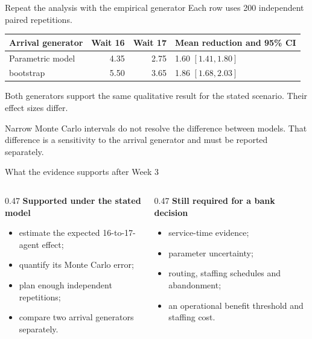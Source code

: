 \documentclass{beamer}
\begin{document}
\begin{frame}{Repeat the analysis with the empirical generator}
  \footnotesize
  Each row uses 200 independent paired repetitions.

  \centering
  \setlength{\tabcolsep}{4pt}
  \begin{tabular}{@{}p{3.35cm}rrp{2.75cm}@{}}
    \toprule
    Arrival generator & \multicolumn{1}{c}{Wait 16} & \multicolumn{1}{c}{Wait 17} & Mean reduction and 95\% CI\\
    \midrule
    Parametric model & 4.35 & 2.75 & 1.60 $[1.41,1.80]$\\
    bootstrap & 5.50 & 3.65 & 1.86 $[1.68,2.03]$\\
    \bottomrule
  \end{tabular}

  \raggedright
  \vspace{0.8em}
  Both generators support the same qualitative result for the stated scenario. Their effect sizes differ.

  \vspace{0.5em}
  Narrow Monte Carlo intervals do not resolve the difference between models. That difference is a sensitivity to the arrival generator and must be reported separately.
\end{frame}

\begin{frame}{What the evidence supports after Week 3}
  \begin{columns}[T,onlytextwidth]
    \begin{column}{0.47\textwidth}
      \textbf{Supported under the stated model}
      \begin{itemize}
        \item estimate the expected 16-to-17-agent effect;
        \item quantify its Monte Carlo error;
        \item plan enough independent repetitions;
        \item compare two arrival generators separately.
      \end{itemize}
    \end{column}
    \begin{column}{0.47\textwidth}
      \textbf{Still required for a bank decision}
      \begin{itemize}
        \item service-time evidence;
        \item parameter uncertainty;
        \item routing, staffing schedules and abandonment;
        \item an operational benefit threshold and staffing cost.
      \end{itemize}
    \end{column}
  \end{columns}
\end{frame}
\end{document}
